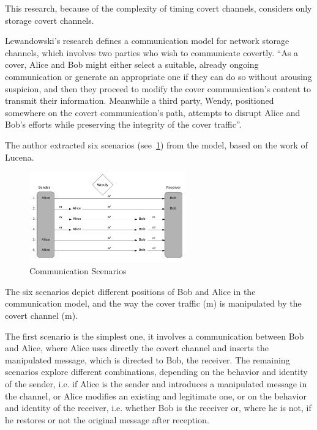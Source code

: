 \documentclass[12pt]{article}
\begin{document}
This research, because of the complexity of timing covert channels, considers only storage covert channels.

Lewandowski's research defines a communication model for network storage channels, which involves two parties who wish to communicate covertly. ``As a cover, Alice and Bob might either select a suitable, already ongoing communication or generate an appropriate one if they can do so without arousing suspicion, and then they proceed to modify the cover communication’s content to transmit their information. Meanwhile a third party, Wendy, positioned somewhere on the covert communication’s path, attempts to disrupt Alice and Bob’s efforts while preserving the integrity of the cover traffic''\cite{lewandowski}.


The author extracted six scenarios (see~\cref{fig:commScenarios}) from the model, based on the work of Lucena\cite{lucena}.

\begin{figure}[ht] 
\begin{center}
\includegraphics[width=0.6\textwidth]{communicationScenarios}
\caption{Communication Scenarios\cite{lewandowski}}
\label{fig:commScenarios}
\end{center}
\end{figure}

The six scenarios depict different positions of Bob and Alice in the communication model, and the way the cover traffic (m) is manipulated by the covert channel (m\textprime).

The first scenario is the simplest one, it involves a communication between Bob and Alice, where Alice uses directly the covert channel and inserts the manipulated message, which is directed to Bob, the receiver. The remaining scenarios explore different combinations, depending on the behavior and identity of the sender, i.e. if Alice is the sender and introduces a manipulated message in the channel, or Alice modifies an existing and legitimate one, or on the behavior and identity of the receiver, i.e. whether Bob is the receiver or, where he is not, if he restores or not the original message after reception\cite{lewandowski}.
\end{document}
